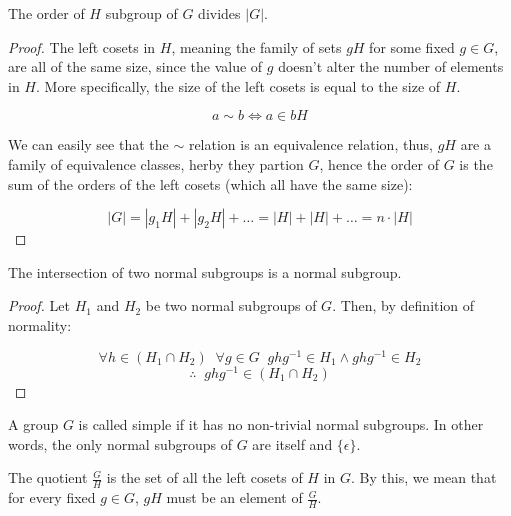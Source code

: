 \begin{theorem}
\label{thm:lagrange}
    The order of $H$ subgroup of $G$ divides $|G|$.
\end{theorem}
\begin{proof}
    The left cosets in $H$, meaning the family of sets $gH$ for some fixed $g \in G$, 
    are all of the same size, since the value of $g$ doesn't alter the number 
    of elements in $H$. More specifically, the size of the left cosets is equal 
    to the size of $H$. 

    $$ a \sim b \iff a \in bH $$ \vspace{0.2em}

    We can easily see that the $\sim$ relation is an equivalence
    relation, thus, $gH$ are a family of equivalence classes, herby they partion $G$, hence  
    the order of $G$ is the sum of the orders of the left cosets (which all have the same size):

    $$ |G| = |g_1H| + |g_2H| + \dots = |H| + |H| + \dots = n \cdot |H| $$

\end{proof}

\newpage

\begin{lemma}
\label{lem:intersectionOfNormalIsNormal}
    The intersection of two normal subgroups is a normal subgroup.
\end{lemma}
\begin{proof}
    Let $H_1$ and $H_2$ be two normal subgroups of $G$. Then, by definition of normality:

    $$ \forall h \in (H_1 \cap H_2) \;\;\forall g \in G\;\; ghg^{-1} \in H_1 \land ghg^{-1} \in H_2 $$
    $$ \therefore\;\; ghg^{-1} \in (H_1 \cap H_2) $$
\end{proof} \vspace{0.2em}

\begin{definition}
    A group $G$ is called simple if it has no non-trivial normal subgroups. In other words, the only 
    normal subgroups of $G$ are itself and $\{\epsilon\}$.
\end{definition} \vspace{0.2em}

\begin{definition}
    The quotient $\frac{G}{H}$ is the set of all the left cosets of $H$ in $G$. 
    By this, we mean that for every fixed $g \in G$, $gH$ must be an element of $\frac{G}{H}$.
\end{definition} \vspace{0.2em}


